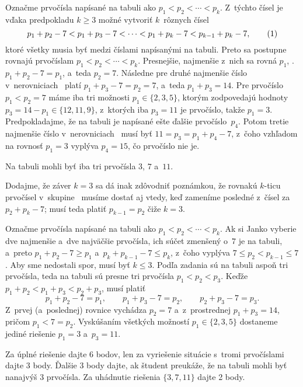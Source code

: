 {%
Označme prvočísla napísané na tabuli ako $p_1 < p_2 < \cdots < p_k$.
Z~týchto čísel je vďaka predpokladu $k \ge 3$ možné vytvoriť $k$~rôznych čísel
$$
p_1 + p_2 - 7 < p_1 + p_3 - 7 < \cdots < p_1 + p_k - 7 < p_ {k-1} + p_k - 7, \tag1
$$
ktoré všetky musia byť medzi číslami napísanými na tabuli. Preto sa postupne rovnajú
prvočíslam $p_1 < p_2 < \cdots < p_k$. Presnejšie, najmenšie z~nich sa rovná
$p_1$, \tj. $p_1 + p_2 -7 = p_1$, a~teda $p_2 = 7$. Následne pre druhé najmenšie
číslo v~nerovniciach~ platí $p_1 + p_3 -7 = p_2 = 7$, a~teda
$p_1 + p_3 = 14$. Pre prvočíslo $p_1 < p_2 = 7$ máme iba tri možnosti
$p_1 \in \{2, 3, 5 \}$, ktorým zodpovedajú hodnoty $p_3 = 14 - p_1 \in \{12, 11, 9 \}$,
z~ktorých iba $p_3 = 11$ je prvočíslo, takže $p_1=3$. Predpokladajme, že na tabuli je
napísané ešte ďalšie prvočíslo~$p_4$. Potom tretie najmenšie číslo
v~nerovniciach~ musí byť $11 = p_3 = p_1 + p_4 - 7$, z~čoho vzhľadom
na rovnosť $p_1 = 3$ vyplýva $p_4 = 15$, čo prvočíslo nie je.

\odpoved
Na tabuli mohli byť iba tri prvočísla $3$, $7$ a~$11$.

Dodajme, že záver $k=3$ sa dá inak zdôvodniť poznámkou, že rovnakú $k$-ticu
prvočísel v~skupine~ musíme dostať aj vtedy, keď zameníme posledné z~čísel za
$p_2+p_k-7$; musí teda platiť $p_{k-1}=p_2$ čiže $k=3$.

\ineriesenie
Označme prvočísla napísané na tabuli ako $p_1 < p_2 < \cdots < p_k$. Ak si
Janko vyberie dve najmenšie a~dve najväčšie prvočísla, ich súčet
zmenšený o~$7$ je na tabuli, a~preto $p_1 + p_2 -7 \ge p_1$ a~$p_k + p_ {k-1} -7 \le
p_k$, z~čoho vyplýva $7 \le p_2 < p_ {k- 1} \le 7$. Aby sme nedostali spor, musí byť
$k \le 3$. Podľa zadania sú na tabuli aspoň tri prvočísla, teda na tabuli
sú presne tri prvočísla $p_1 < p_2 < p_3$. Keďže
$p_1 + p_2 < p_1 + p_3 < p_2 + p_3$, musí platiť
$$
p_1 + p_2 - 7 = p_1, \qquad p_1 + p_3 - 7 = p_2, \qquad p_2 + p_3 - 7 = p_3.
$$
Z~prvej (a~poslednej) rovnice vychádza $p_2 = 7$ a~z~prostrednej $p_1 + p_3 = 14$,
pričom $p_1 < 7 = p_2$. Vyskúšaním všetkých možností $p_1 \in \{2, 3, 5 \}$ dostaneme
jediné riešenie $p_1 = 3$ a~$p_3 = 11$.


\nobreak\medskip\petit\noindent
Za úplné riešenie dajte 6 bodov,
len za vyriešenie situácie s~tromi prvočíslami dajte 3 body.
Ďalšie 3 body dajte, ak študent preukáže, že na tabuli mohli byť
nanajvýš 3 prvočísla. Za uhádnutie riešenia $\{3, 7, 11 \}$ dajte 2 body.

\endpetit
\bigbreak
}

